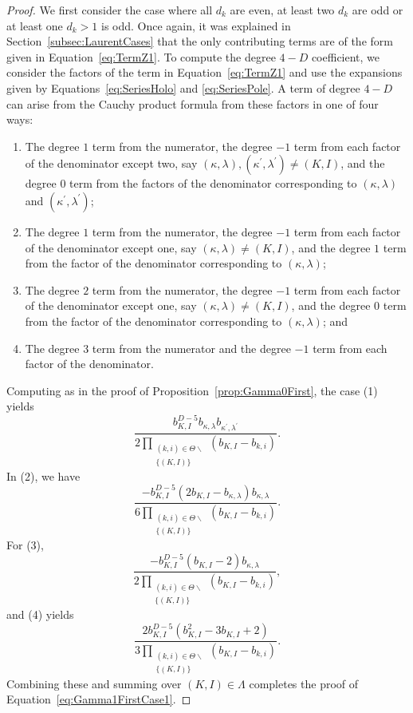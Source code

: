 \documentclass{amsart}
\theoremstyle{definition}
\theoremstyle{remark}
\begin{document}
\begin{proof}
We first consider the case where all $d_k$ are even, at least two $d_k$ are odd or at least one $d_k > 1$ is odd.
Once again, it was explained in Section~\ref{subsec:LaurentCases} that the only contributing terms are of the form
given in Equation~\eqref{eq:TermZ1}. To compute the degree $4 - D$ coefficient, we consider the factors of the term
in Equation~\eqref{eq:TermZ1} and use the expansions given by Equations~\eqref{eq:SeriesHolo} and \eqref{eq:SeriesPole}.
A term of degree $4 - D$ can arise from the Cauchy product formula from these factors in one of four ways:
\begin{enumerate}
\item   The degree $1$ term from the numerator, the degree $-1$ term from each factor of the
        denominator except two, say $(\kappa,\lambda), (\kappa^\prime,\lambda^\prime)\neq (K,I)$,
        and the degree $0$ term from the factors of the denominator corresponding to $(\kappa,\lambda)$ and
        $(\kappa^\prime,\lambda^\prime)$;

\item   The degree $1$ term from the numerator, the degree $-1$ term from each factor of the denominator except
        one, say $(\kappa,\lambda)\neq (K,I)$, and the degree $1$ term from the factor of the denominator corresponding
        to $(\kappa,\lambda)$;

\item   The degree $2$ term from the numerator, the degree $-1$ term from each factor of the denominator except
        one, say $(\kappa,\lambda)\neq (K,I)$, and the degree $0$ term from the factor of the denominator corresponding
        to $(\kappa,\lambda)$; and

\item   The degree $3$ term from the numerator and the degree $-1$ term from each factor of the denominator.
\end{enumerate}

Computing as in the proof of Proposition~\ref{prop:Gamma0First}, the case (1) yields
\[
    \frac{b_{K,I}^{D-5} b_{\kappa,\lambda}b_{\kappa^\prime,\lambda^\prime}}
        {2\prod\limits_{\substack{(k,i)\in\Theta\smallsetminus \\ \{ (K,I)\} }} (b_{K,I} - b_{k,i})}.
\]
In (2), we have
\[
    \frac{- b_{K,I}^{D-5} (2b_{K,I} - b_{\kappa,\lambda}) b_{\kappa,\lambda}}
        {6\prod\limits_{\substack{(k,i)\in\Theta\smallsetminus \\ \{ (K,I)\} }} (b_{K,I} - b_{k,i})}.
\]
For (3),
\[
    \frac{- b_{K,I}^{D-5} (b_{K,I} - 2)b_{\kappa,\lambda} }
        {2\prod\limits_{\substack{(k,i)\in\Theta\smallsetminus \\ \{ (K,I)\} }} (b_{K,I} - b_{k,i})},
\]
and (4) yields
\[
    \frac{2 b_{K,I}^{D-5} (b_{K,I}^2 - 3b_{K,I} + 2) }
        {3\prod\limits_{\substack{(k,i)\in\Theta\smallsetminus \\ \{ (K,I)\} }} (b_{K,I} - b_{k,i})}.
\]
Combining these and summing over $(K,I)\in\Lambda$ completes the proof of Equation~\eqref{eq:Gamma1FirstCase1}.


\end{proof}
\end{document}
